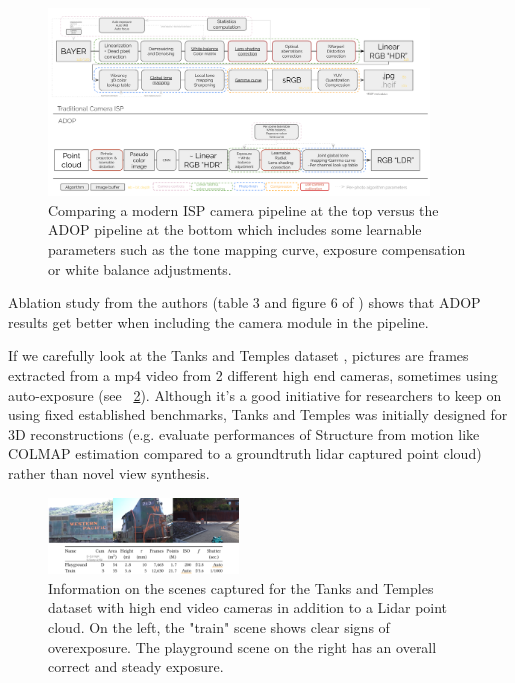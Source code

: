 \begin{figure}[h]
    \centering
    \includegraphics[width=0.9\textwidth]{figures/isp_pipeline_VS_ADOP.png}
    \caption{Comparing a modern ISP camera pipeline at the top versus the ADOP pipeline at the bottom which includes some learnable parameters such as the tone mapping curve, exposure compensation or white balance adjustments.}
    \label{fig:ISP}
\end{figure}

\noindent Ablation study from the authors (table 3 and figure 6 of \cite{Aruckert2022adop}) shows that ADOP results get better when including the camera module in the pipeline.

\noindent If we carefully look at the Tanks and Temples dataset \cite{Knapitsch2017TanksAndTemples}, pictures are frames extracted from a mp4 video from 2 different high end cameras, sometimes using auto-exposure (see ~\cref{fig:tank_and_temples}). Although it's a good initiative for researchers to keep on using fixed established benchmarks, Tanks and Temples was initially designed for 3D reconstructions (e.g. evaluate performances of Structure from motion like COLMAP estimation compared to a groundtruth lidar captured point cloud) rather than novel view synthesis. 


\begin{figure}[H]
    \centering
    \includegraphics[width=0.45\textwidth]{figures/tanks_and_temples.png}
    \caption{Information on the scenes captured for the Tanks and Temples dataset with high end video cameras in addition to a Lidar point cloud. On the left, the "train" scene shows clear signs of overexposure. The playground scene on the right has an overall correct and steady exposure.}
    \label{fig:tank_and_temples}
\end{figure}


